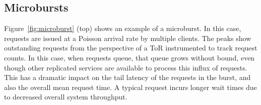





\subsection{Microbursts}

Figure~\ref{fig:microburst} (top) shows an example of a microburst. In this
case, requests are issued at a Poisson arrival rate by multiple clients.  The
peaks show outstanding requests from the perspective of a ToR instrumented to
track request counts. In this case, when requests queue, that queue grows
without bound, even though other replicated services are available to process
this influx of requests. This has a dramatic impact on the tail latency of the
requests in the burst, and also the overall mean request time. A typical
request incurs longer wait times due to decreased overall system throughput.

